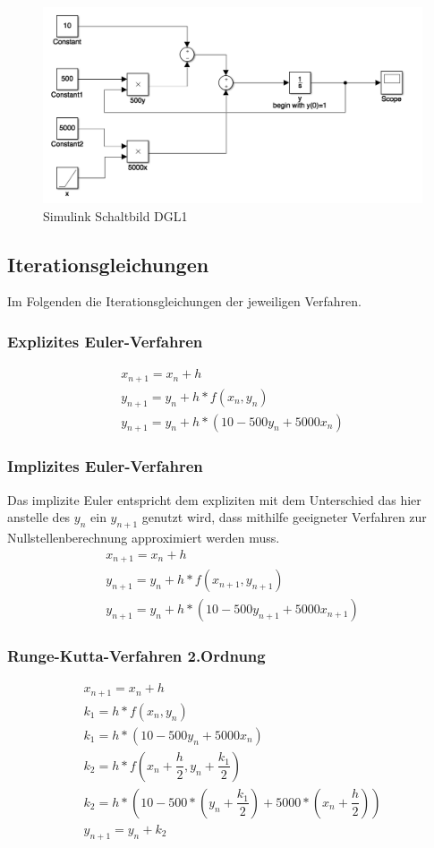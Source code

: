\documentclass[]{scrartcl}
\begin{document}
\begin{figure}[H]
\centering
\includegraphics[width=1\linewidth]{a1_1_Schaltbild}
\caption{Simulink Schaltbild DGL1}
\label{fig:A1_1_Schaltbild}
\end{figure}

\subsection{Iterationsgleichungen}
Im Folgenden die Iterationsgleichungen der jeweiligen Verfahren.

\subsubsection{Explizites Euler-Verfahren}
\begin{align}
x_{n+1} = x_{n}+h \\
y_{n+1} = y_{n}+h*f(x_{n},y_{n}) \\
y_{n+1} = y_{n}+h*(10-500y_{n}+5000x_{n})
\end{align}

\subsubsection{Implizites Euler-Verfahren}
Das implizite Euler entspricht dem expliziten mit dem Unterschied das hier anstelle des $y_{n}$ ein $y_{n+1}$ genutzt wird, dass mithilfe geeigneter Verfahren zur Nullstellenberechnung approximiert werden muss. 
\begin{align}
x_{n+1} = x_{n}+h \\
y_{n+1} = y_{n}+h*f(x_{n+1},y_{n+1}) \\
y_{n+1} = y_{n}+h*(10-500y_{n+1}+5000x_{n+1})
\end{align}

\subsubsection{Runge-Kutta-Verfahren 2.Ordnung}
\begin{align}
x_{n+1} = x_{n}+h \\
k_{1} = h*f(x_{n},y_{n}) \\
k_{1} = h*(10-500y_{n}+5000x_{n}) \\
k_{2} = h*f(x_{n} + \dfrac{h}{2},y_{n} + \dfrac{k_{1}}{2}) \\
k_{2} = h*(10-500*(y_{n} + \dfrac{k_{1}}{2})+5000*(x_{n} + \dfrac{h}{2})) \\
y_{n+1} = y_{n}+k_{2}
\end{align}
\end{document}
